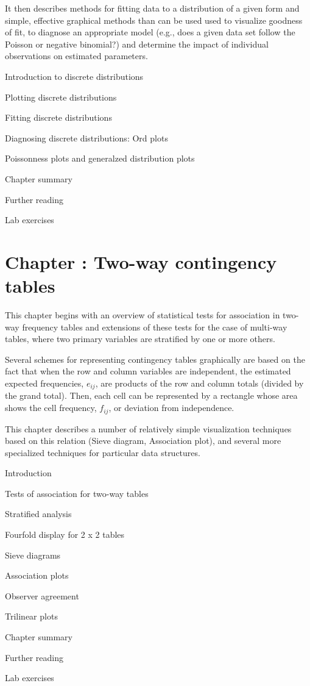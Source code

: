 \documentclass{article}
\newcommand{\Chapter}[1]{\section{Chapter \thesection: #1}}
\newcommand{\Section}[1]{\item #1}
\begin{document}
It then describes methods for fitting data to a distribution of a given form
and simple, effective
graphical methods than can be used used to visualize goodness of fit,
to diagnose an appropriate model (e.g., does a given data set follow the
Poisson or negative binomial?) and determine the impact of
individual observations on estimated parameters.


\begin{enumerate*}
	\Section{Introduction to discrete distributions}
	\Section{Plotting discrete distributions}\label{sec:discrete-distrib}
	\Section{Fitting discrete distributions}\label{sec:discrete-fit}
	\Section{Diagnosing discrete distributions: Ord plots}%
	\Section{Poissonness plots and generalzed distribution plots}\label{sec:discrete-Poissonness}
	\Section{Chapter summary}
	\Section{Further reading}
  \Section{Lab exercises}
\end{enumerate*}


\Chapter{Two-way contingency tables}\label{ch:twoway}

This chapter begins with an overview of statistical tests for
association in two-way frequency tables and extensions of these
tests for the case of multi-way tables, where two primary
variables are stratified by one or more others.

Several schemes for representing contingency tables graphically are
based on the fact that when the row and column variables are
independent, the estimated expected frequencies, \(e_{ij}\), are
products of the row and column totals (divided by the grand total).
Then, each cell can be represented by a rectangle whose area shows
the cell frequency, \(f_{ij}\),  or deviation from independence.

This chapter describes a number of relatively simple
visualization techniques based on this relation (Sieve diagram, Association plot), and several
more specialized techniques for particular data structures.

\begin{enumerate*}
	\Section{Introduction}
	\Section{Tests of association for two-way tables}\label{sec:twoway-tests}
	\Section{Stratified analysis}\label{sec:twoway-strat}
	\Section{Fourfold display for 2 x 2 tables}\label{sec:twoway-fourfold}
	\Section{Sieve diagrams}\label{sec:twoway-sieve}
	\Section{Association plots}\label{sec:twoway-assoc}
	\Section{Observer agreement}\label{sec:twoway-agree}
	\Section{Trilinear plots}\label{sec:twoway-trilinear}
	\Section{Chapter summary}\label{sec:twoway-summary}
	\Section{Further reading}\label{sec:twoway-reading}
	\Section{Lab exercises}\label{sec:twoway-lab}
\end{enumerate*}
\end{document}
